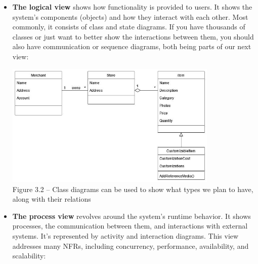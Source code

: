 \begin{itemize}
\item 
\textbf{The logical view} shows how functionality is provided to users. It shows the system's components (objects) and how they interact with each other. Most commonly, it consists of class and state diagrams. If you have thousands of classes or just want to better show the interactions between them, you should also have communication or sequence diagrams, both being parts of our next view:

\begin{center}
\includegraphics[width=0.8\textwidth]{content/1/chapter3/images/2.jpg}\\
Figure 3.2 – Class diagrams can be used to show what types we plan to have, along with their relations
\end{center}

\item 
\textbf{The process view} revolves around the system's runtime behavior. It shows processes, the communication between them, and interactions with external systems. It's represented by activity and interaction diagrams. This view addresses many NFRs, including concurrency, performance, availability, and scalability:


\end{itemize}
